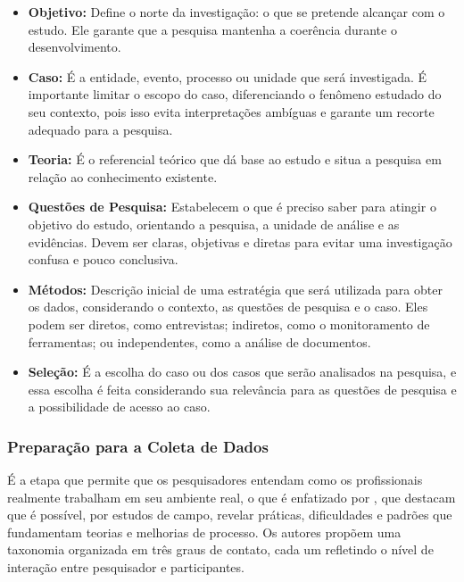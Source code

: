 \begin{itemize}
    \item \textbf{Objetivo:} Define o norte da investigação: o que se pretende alcançar com o estudo. Ele garante que a pesquisa mantenha a coerência durante o desenvolvimento.
    \item \textbf{Caso:} É a entidade, evento, processo ou unidade que será investigada. É importante limitar o escopo do caso, diferenciando o fenômeno estudado do seu contexto, pois isso evita interpretações ambíguas e garante um recorte adequado para a pesquisa.
    \item \textbf{Teoria:} É o referencial teórico que dá base ao estudo e situa a pesquisa em relação ao conhecimento existente.
      \item \textbf{Questões de Pesquisa:} Estabelecem o que é preciso saber para atingir o objetivo do estudo, orientando a pesquisa, a unidade de análise e as evidências. Devem ser claras, objetivas e diretas para evitar uma investigação confusa e pouco conclusiva.
    \item \textbf{Métodos:} Descrição inicial de uma estratégia que será utilizada para obter os dados, considerando o contexto, as questões de pesquisa e o caso. Eles podem ser diretos, como entrevistas; indiretos, como o monitoramento de ferramentas; ou independentes, como a análise de documentos.
    \item \textbf{Seleção:} É a escolha do caso ou dos casos que serão analisados na pesquisa, e essa escolha é feita considerando sua relevância para as questões de pesquisa e a possibilidade de acesso ao caso.
\end{itemize}

\subsubsection{Preparação para a Coleta de Dados}

É a etapa que permite que os pesquisadores entendam como os profissionais realmente trabalham em seu ambiente real, o que é enfatizado por , que destacam que é possível, por estudos de campo, revelar práticas, dificuldades e padrões que fundamentam teorias e melhorias de processo. Os autores propõem uma taxonomia organizada em três graus de contato, cada um refletindo o nível de interação entre pesquisador e participantes.


